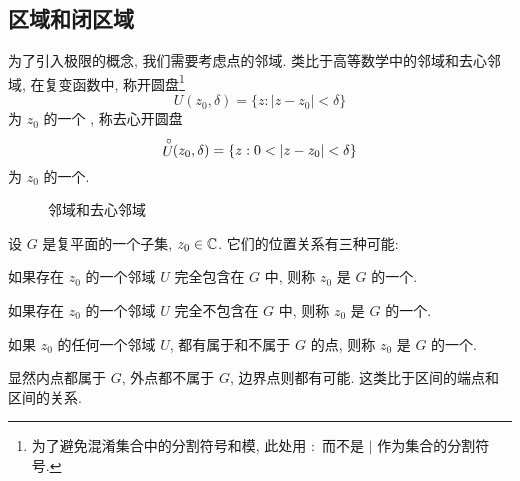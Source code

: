 \subsection{区域和闭区域}

为了引入极限的概念, 我们需要考虑点的邻域.
类比于高等数学中的邻域和去心邻域, 在复变函数中, 称开圆盘\footnote{%
  为了避免混淆集合中的分割符号和模, 此处用 $:$ 而不是 $\mid$ 作为集合的分割符号.%
}
  \[U(z_0,\delta)=\{z:|z-z_0|<\delta\}\]
为 $z_0$ 的一个 , 称去心开圆盘
  \[\Uc(z_0,\delta)=\{z:0<|z-z_0|<\delta\}\]
为 $z_0$ 的一个.

\begin{figure}[!h]
  \centering
  \begin{minipage}{.48\textwidth}
    \centering
  \end{minipage}
  \begin{minipage}{.48\textwidth}
    \centering
  \end{minipage}
  \caption{邻域和去心邻域}
\end{figure}

设 $G$ 是复平面的一个子集, $z_0\in{\mathbb{C}}$.
它们的位置关系有三种可能:
\begin{enumpar}
  \item 如果存在 $z_0$ 的一个邻域 $U$ 完全包含在 $G$ 中, 则称 $z_0$ 是 $G$ 的一个.
  \item 如果存在 $z_0$ 的一个邻域 $U$ 完全不包含在 $G$ 中, 则称 $z_0$ 是 $G$ 的一个.
  \item 如果 $z_0$ 的任何一个邻域 $U$, 都有属于和不属于 $G$ 的点, 则称 $z_0$ 是 $G$ 的一个.
\end{enumpar}\par\noindent
显然内点都属于 $G$, 外点都不属于 $G$, 边界点则都有可能.
这类比于区间的端点和区间的关系.

